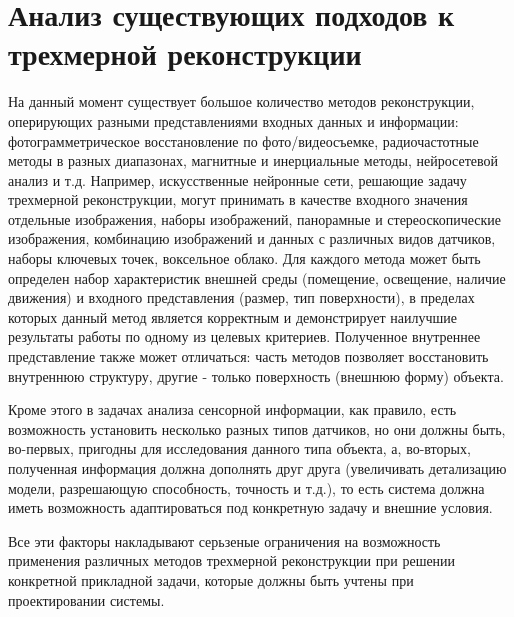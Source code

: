 \section{Анализ существующих подходов к трехмерной реконструкции}
\label{sec_3d_models_analysis}

На данный момент существует большое количество методов реконструкции, оперирующих разными представлениями входных данных и информации: фотограмметрическое восстановление по фото/видеосъемке, радиочастотные методы в разных диапазонах, магнитные и инерциальные методы, нейросетевой анализ и т.д. Например, искусственные нейронные сети, решающие задачу трехмерной реконструкции, могут принимать в качестве входного значения отдельные изображения, наборы изображений, панорамные и стереоскопические изображения, комбинацию изображений и данных с различных видов датчиков, наборы ключевых точек, воксельное облако. Для каждого метода может быть определен набор характеристик внешней среды (помещение, освещение, наличие движения) и входного представления (размер, тип поверхности), в пределах которых данный метод является корректным и демонстрирует наилучшие результаты работы по одному из целевых критериев. Полученное внутреннее представление также может отличаться: часть методов позволяет восстановить внутреннюю структуру, другие - только поверхность (внешнюю форму) объекта.

Кроме этого в задачах анализа сенсорной информации, как правило, есть возможность установить несколько разных типов датчиков, но они должны быть, во-первых, пригодны для исследования данного типа объекта, а, во-вторых, полученная информация должна дополнять друг друга (увеличивать детализацию модели, разрешающую способность, точность и т.д.), то есть система должна иметь возможность адаптироваться под конкретную задачу и внешние условия.

Все эти факторы накладывают серьзеные ограничения на возможность применения различных методов трехмерной реконструкции при решении конкретной прикладной задачи, которые должны быть учтены при проектировании системы.

